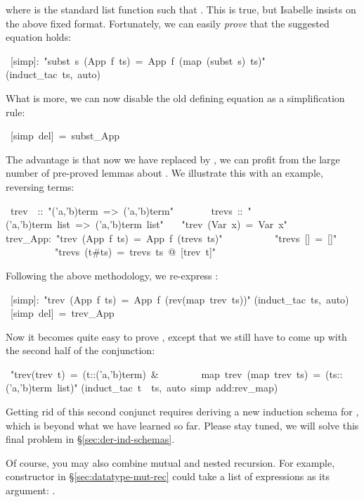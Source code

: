 \begin{isabelle}
\begin{isamarkuptext}
\begin{quote}
\end{quote}
where  is the standard list function such that
. This is true, but Isabelle insists
on the above fixed format. Fortunately, we can easily \emph{prove} that the
suggested equation holds:%
\end{isamarkuptext}%
\ [simp]:\ {"}subst\ s\ (App\ f\ ts)\ =\ App\ f\ (map\ (subst\ s)\ ts){"}\isanewline
{}(induct\_tac\ ts,\ auto)%
\begin{isamarkuptext}%
What is more, we can now disable the old defining equation as a
simplification rule:%
\end{isamarkuptext}%
\ [simp\ del]\ =\ subst\_App%
\begin{isamarkuptext}%
The advantage is that now we have replaced  by ,
we can profit from the large number of pre-proved lemmas about .
We illustrate this with an example, reversing terms:%
\end{isamarkuptext}%
\ trev\ \ ::\ {"}('a,'b)term\ =>\ ('a,'b)term{"}\isanewline
\ \ \ \ \ \ \ trevs\ ::\ {"}('a,'b)term\ list\ =>\ ('a,'b)term\ list{"}\isanewline
{}\ \ \ {"}trev\ (Var\ x)\ =\ Var\ x{"}\isanewline
trev\_App:\ {"}trev\ (App\ f\ ts)\ =\ App\ f\ (trevs\ ts){"}\isanewline
\isanewline
\ \ \ \ \ \ \ \ \ \ {"}trevs\ []\ =\ []{"}\isanewline
\ \ \ \ \ \ \ \ \ \ {"}trevs\ (t\#ts)\ =\ trevs\ ts\ @\ [trev\ t]{"}%
\begin{isamarkuptext}%
\noindent
Following the above methodology, we re-express :%
\end{isamarkuptext}%
\ [simp]:\ {"}trev\ (App\ f\ ts)\ =\ App\ f\ (rev(map\ trev\ ts)){"}\isanewline
{}(induct\_tac\ ts,\ auto)\isanewline
{}\ [simp\ del]\ =\ trev\_App%
\begin{isamarkuptext}%
\noindent
Now it becomes quite easy to prove , except that we
still have to come up with the second half of the conjunction:%
\end{isamarkuptext}%
\ {"}trev(trev\ t)\ =\ (t::('a,'b)term)\ \&\isanewline
\ \ \ \ \ \ \ \ map\ trev\ (map\ trev\ ts)\ =\ (ts::('a,'b)term\ list){"}\isanewline
{}(induct\_tac\ t\ \ ts,\ auto\ simp\ add:rev\_map)%
\begin{isamarkuptext}%
\noindent
Getting rid of this second conjunct requires deriving a new induction schema
for , which is beyond what we have learned so far. Please stay
tuned, we will solve this final problem in \S\ref{sec:der-ind-schemas}.

Of course, you may also combine mutual and nested recursion. For example,
constructor  in \S\ref{sec:datatype-mut-rec} could take a list of
expressions as its argument: .%
\end{isamarkuptext}%
\end{isabelle}%

